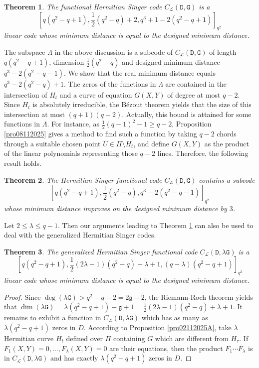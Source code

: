 \documentclass[9pt]{article}
\theoremstyle{plain}
\newtheorem{thm}{Theorem}[section]
\begin{document}
\begin{thm}\label{main} The functional Hermitian Singer code 
    $C_{\mathcal{L}}(\mathtt D,\mathtt G)$ is a $$[q(q^2-q+1), \textstyle{\frac{1}{2}}(q^2-q)+2, q^3+1-2(q^2-q+1)]_{q^2}
    $$ linear code whose  minimum distance is equal to the designed minimum distance. 
\end{thm}
The subspace $\Lambda$ in the above discussion is a subcode of $C_{\mathcal{L}}(\mathtt{D,\mathtt{G}})$ of length $q(q^2-q+1)$, dimension $\frac{1}{2}(q^2-q)$ and designed minimum distance $q^3-2(q^2-q-1)$. We show that the real minimum distance equals $q^3-2(q^2-q)+1$. The zeros of the functions in $\Lambda$ are contained in the intersection of $H_t$ and a curve of equation $G(X,Y)$ of degree at most $q-2$. Since $H_t$ is absolutely irreducible, the B\'ezout theorem yields that the size of this intersection at most $(q+1)(q-2)$. Actually, this bound is attained for some functions in $\Lambda$. For instance, as $\frac{1}{2}(q-1)^2-1\ge q-2$,  Proposition \ref{pro08112025} gives a method to find such a function by taking $q-2$ chords through a suitable chosen point $U\in \Pi\setminus H_t$, and define $G(X,Y)$ as the product of the linear polynomials representing those $q-2$ lines. Therefore, the following result holds.  
\begin{thm} The Hermitian Singer functional code 
\label{the08112025} $C_{\mathcal{L}}(\mathtt{D},\mathtt{G})$ contains a subcode $$[q(q^2-q+1), \textstyle{\frac{1}{2}}(q^2-q), q^3-2(q^2-q-1)]_{q^2}$$ whose minimum distance improves on the designed minimum distance by $3$.
\end{thm} 
Let $2\le \lambda\le q-1$. Then our arguments leading to Theorem \ref{main} can also be used to deal with the generalized Hermitian Singer codes. 
\begin{thm}\label{main1} The generalized Hermitian Singer functional code 
$C_{\mathcal{L}}(\mathtt D,\lambda\mathtt G)$ is a $$[q(q^2-q+1), \textstyle{\frac{1}{2}}(2\lambda-1)(q^2-q)+\lambda+1, (q-\lambda)(q^2-q+1)]_{q^2}$$ linear code whose  minimum distance is equal to the designed minimum distance. 
\end{thm}
\begin{proof} Since $\deg(\lambda\mathtt{G})>q^2-q-2=2\mathfrak{g}-2$, the Riemann-Roch theorem yields that $\dim(\lambda\mathtt{G})=\lambda(q^2-q+1)-\mathfrak{g}+1=\frac{1}{2}(2\lambda-1)(q^2-q)+\lambda+1$. It remains to exhibit a function in $C_{\mathcal{L}}(\mathtt D,\lambda\mathtt G)$ which has as many as $\lambda(q^2-q+1)$ zeros in $D$.  According to Proposition \ref{pro02112025A}, take $\lambda$ Hermitian curve $H_t$ defined over $\Pi$  containing $G$ which are different from $H_\tau$. If $F_1(X,Y)=0, \ldots, F_\lambda(X,Y)=0$ are their equations, then the product $F_1\cdots F_\lambda$ is in $C_{\mathcal{L}}(\mathtt D,\lambda\mathtt G)$ and has exactly $\lambda(q^2-q+1)$ zeros in $D$.   
 \end{proof}
\end{document}

